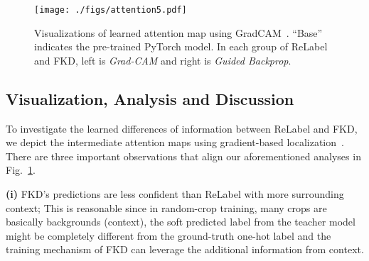 \documentclass[10pt,twocolumn,letterpaper]{article}
\begin{document}
\begin{table}[]
\centering
\caption{Comparison of transfer learning performance with ReLabel~\cite{yun2021re} on detection and instance segmentation tasks. The training and evaluation are conducted on COCO dataset~\cite{lin2014microsoft}.}
\label{tab:grid_transfer}
\vspace{-0.1in}
\vspace{-0.08in}
\end{table}


\begin{figure}[t]
  \centering
  \texttt{[image: ./figs/attention5.pdf]}
  \vspace{-0.15in}
  \caption{Visualizations of learned attention map using GradCAM~\cite{selvaraju2017grad,jacobgilpytorchcam}. ``Base'' indicates the pre-trained PyTorch model. In each group of ReLabel and FKD, left is {\em Grad-CAM} and right is {\em Guided Backprop}.} 
  \label{fig:dis_visualization}
  \vspace{-0.15in}
\end{figure}

\subsection{Visualization, Analysis and Discussion}

To investigate the learned differences of information between ReLabel and FKD, we depict the intermediate attention maps using gradient-based localization~\cite{selvaraju2017grad}. There are three important observations that align our aforementioned analyses in Fig.~\ref{fig:dis_visualization}.

{\bf (i)} FKD's predictions are less confident than ReLabel with more surrounding context; This is reasonable since in random-crop training, many crops are basically backgrounds (context), the soft predicted label from the teacher model might be completely different from the ground-truth one-hot label and the training mechanism of FKD can leverage the additional information from context.
\end{document}
